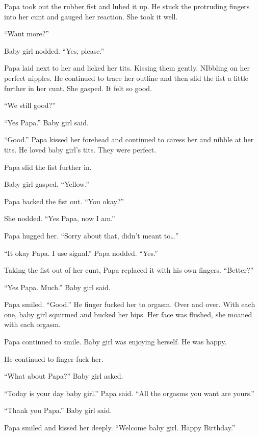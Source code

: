     Papa took out the rubber fist and lubed it up. He stuck the protruding fingers into her cunt and gauged her reaction. She took it well.

    “Want more?”

    Baby girl nodded. “Yes, please.”

    Papa laid next to her and licked her tits. Kissing them gently. NIbbling on her perfect nipples. He continued to trace her outline and then slid the fist a little further in her cunt. She gasped. It felt so good.

    “We still good?”

    “Yes Papa.” Baby girl said.

    “Good.” Papa kissed her forehead and continued to caress her and nibble at her tits. He loved baby girl’s tits. They were perfect.

    Papa slid the fist further in.

    Baby girl gasped. “Yellow.”

    Papa backed the fist out. “You okay?”

    She nodded. “Yes Papa, now I am.”

    Papa hugged her. “Sorry about that, didn’t meant to…”

    “It okay Papa. I use signal.”
    Papa nodded. “Yes.”

    Taking the fist out of her cunt, Papa replaced it with his own fingers. “Better?”

    “Yes Papa. Much.” Baby girl said.

    Papa smiled. “Good.” He finger fucked her to orgasm. Over and over. With each one, baby girl squirmed and bucked her hips. Her face was flushed, she moaned with each orgasm.

    Papa continued to smile. Baby girl was enjoying herself. He was happy.

    He continued to finger fuck her.

    “What about Papa?” Baby girl asked.

    “Today is your day baby girl.” Papa said. “All the orgasms you want are yours.”

    “Thank you Papa.” Baby girl said.

    Papa smiled and kissed her deeply. “Welcome baby girl. Happy Birthday.”

